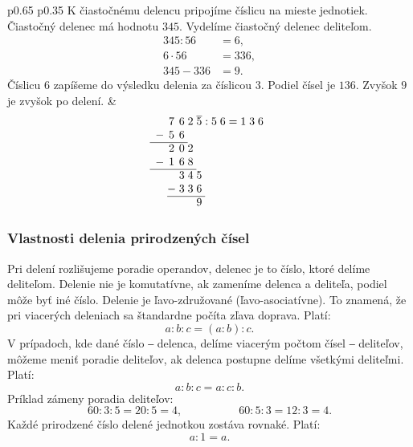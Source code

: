\documentclass{article}
\begin{document}
\begin{longtable}{p{} p{}}
K čiastočnému delencu pripojíme číslicu na mieste jednotiek. Čiastočný delenec má hodnotu \(345\).
Vydelíme čiastočný delenec deliteľom.
\[
\begin{aligned}
  345 : 56 &= 6, \\
  6 \cdot 56 &= 336, \\
  345 - 336 &= 9.
\end{aligned}
\]
Číslicu \(6\) zapíšeme do výsledku delenia za číslicou \(3\).
Podiel čísel je \(136\). Zvyšok \(9\) je zvyšok po delení.
&
\[
\begin{array}{c@{\;}c@{\;}c@{\;}c@{\;}c@{\;}c@{\;}c@{\;}c@{\;}c@{\;}c@{\;}c@{\;}c}
    & 7 & 6 & 2 & \overline{5} & : & 5 & 6 & = & 1 & 3 & 6 \\
  - & 5 & 6 \\
  \cline{1-3}
    & 2 & 0 & 2 \\
  - & 1 & 6 & 8 \\
  \cline{1-4}
    &   & 3 & 4 & 5 \\
    & - & 3 & 3 & 6\\
  \cline{2-5}
    &   &   &   & 9
\end{array}
\]

\end{longtable}

\subsubsection{Vlastnosti delenia prirodzených čísel}

Pri delení rozlišujeme poradie operandov, delenec je to číslo, ktoré delíme deliteľom. Delenie nie je komutatívne, ak zameníme delenca a deliteľa, podiel môže byť iné číslo. Delenie je ľavo-združované (ľavo-asociatívne). To znamená, že pri viacerých deleniach sa štandardne počíta zľava doprava. Platí:
\[
a : b : c = (a : b) : c.
\]
V prípadoch, kde dané číslo ‒ delenca, delíme viacerým počtom čísel ‒ deliteľov, môžeme meniť poradie deliteľov, ak delenca postupne delíme všetkými deliteľmi. Platí:
\[
a : b : c = a : c : b.
\]
Príklad zámeny poradia deliteľov:
\[
60 : 3 : 5 = 20 : 5 = 4, \hspace{5em} 60 : 5 : 3 = 12 : 3 = 4.
\]
Každé prirodzené číslo delené jednotkou zostáva rovnaké. Platí:
\[
a : 1 = a.
\]
\end{document}
